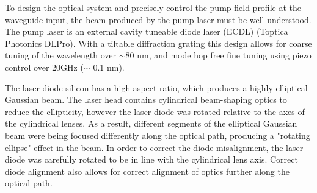 \documentclass[9pt,twocolumn,twoside]{pnas-new}
\begin{document}
To design the optical system and precisely control the pump field profile at the waveguide input, the beam produced by the pump laser must be well understood. The pump laser is an external cavity tuneable diode laser (ECDL) (Toptica Photonics DLPro). With a tiltable diffraction grating this design allows for coarse tuning of the wavelength over $\sim$80 nm, and mode hop free fine tuning using piezo control over 20GHz ($\sim$ 0.1 nm).

The laser diode silicon has a high aspect ratio, which produces a highly elliptical Gaussian beam. The laser head contains cylindrical beam-shaping optics to reduce the ellipticity, however the laser diode was rotated relative to the axes of the cylindrical lenses. As a result, different segments of the elliptical Gaussian beam were being focused differently along the optical path, producing a "rotating ellipse" effect in the beam. In order to correct the diode misalignment, the laser diode was carefully rotated to be in line with the cylindrical lens axis. Correct diode alignment also allows for correct alignment of optics further along the optical path.
\end{document}
